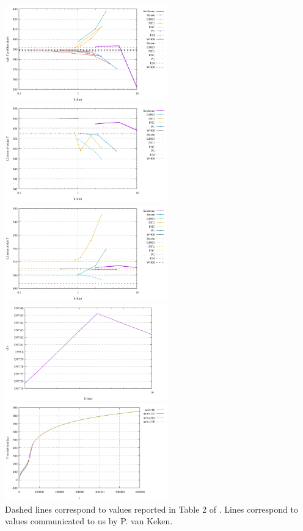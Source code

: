 \begin{center}
\includegraphics[width=7cm]{python_codes/fieldstone_68/results/case1b/Tcorner}
\includegraphics[width=7cm]{python_codes/fieldstone_68/results/case1b/Twedge}\\
\includegraphics[width=7cm]{python_codes/fieldstone_68/results/case1b/Tslab}
\includegraphics[width=7cm]{python_codes/fieldstone_68/results/case1b/Tavrg}\\
\includegraphics[width=7cm]{python_codes/fieldstone_68/results/case1b/tempdiag}\\
{\captionfont Dashed lines correspond to values reported in Table 2 of \cite{vack08}.
Lines correspond to values communicated to us by P. van Keken.}
\end{center}

